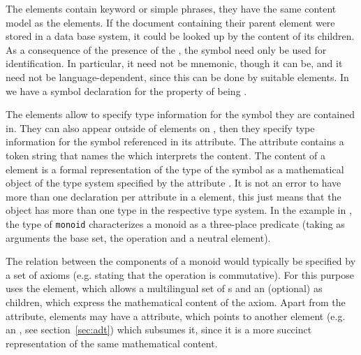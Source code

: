 The {} elements contain keyword or simple phrases, they have the
same content model as the {} elements. If the document containing
their parent {} element were stored in a data base system, it
could be looked up by the content of its {} children. As a
consequence of the presence of the {}, the symbol
{} need only be used for identification. In particular, it
need not be mnemonic, though it can be, and it need not be language-dependent,
since this can be done by suitable {} elements. In
{} we have a symbol declaration for the property of being
{}.

The {} elements allow to specify type information for the symbol they
are contained in. They can also appear outside of {} elements on
{}, then they specify type information for the symbol
referenced in its {} attribute.  The attribute
{} contains a token string that names the {} which interprets the content. The content of a {}
element is a formal representation of the type of the symbol as a mathematical
object of the type system specified by the attribute {}.
It is not an error to have more than one {} declaration per
{} attribute in a {} element, this just
means that the object has more than one type in the respective type system.  In
the example in {}, the type of {\tt{monoid}} characterizes a
monoid as a three-place predicate (taking as arguments the base set, the operation
and a neutral element).

The relation between the components of a monoid would typically be specified by a
set of axioms (e.g. stating that the operation is commutative). For this purpose
{\omdoc} uses the {} element, which allows a multilingual set of
{}s and an (optional) {} as children, which express the
mathematical content of the axiom. Apart from the {}
attribute, {} elements may have a {}
attribute, which points to another {\omdoc} element (e.g. an {}, see
section~\ref{sec:adt}) which subsumes it, since it is a more succinct
representation of the same mathematical content.

